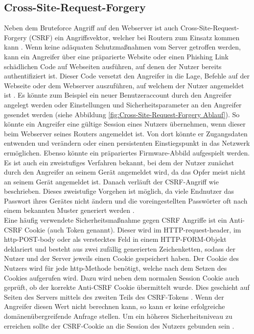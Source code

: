 \documentclass[a4paper]{book}
\begin{document}
\begin{large}
\begin{onehalfspace}
\subsection{Cross-Site-Request-Forgery}
\label{CSRF}
Neben dem Bruteforce Angriff auf den Webserver ist auch Cross-Site-Request-Forgery (CSRF) ein Angriffsvektor, welcher bei Routern zum Einsatz kommen kann \cite{Stuttard.2011}. Wenn keine adäquaten Schutzmaßnahmen vom Server getroffen werden, kann ein Angreifer über eine präparierte Website oder einen \mbox Phishing Link schädlichen Code auf Webseiten ausführen, auf denen der Nutzer bereits authentifiziert ist. Dieser Code versetzt den Angreifer in die Lage, Befehle auf der Webseite oder dem Webserver auszuführen, auf welchem der Nutzer angemeldet ist \cite{Kim.2015}. Es könnte zum Beispiel ein neuer Benutzeraccount durch den Angreifer angelegt werden oder Einstellungen und Sicherheitsparameter an den Angreifer gesendet werden (siehe Abbildung \ref{fig:Cross-Site-Request-Forgery Ablauf}). So könnte ein Angreifer eine gültige Session eines Nutzers übernehmen, wenn dieser beim Webserver seines Routers angemeldet ist. Von dort könnte er Zugangsdaten entwenden und verändern oder einen persistenten Einstiegspunkt in das Netzwerk ermöglichen. Ebenso könnte ein präpariertes Firmware-Abbild aufgespielt werden. Es ist auch ein zweistufiges Verfahren bekannt, bei dem der Nutzer zunächst durch den Angreifer an seinem Gerät angemeldet wird, da das Opfer meist nicht an seinem Gerät angemeldet ist. Danach verläuft der CSRF-Angriff wie beschrieben. Dieses zweistufige Vorgehen ist möglich, da viele Endnutzer das Passwort ihres Gerätes nicht ändern und die voreingestellten Passwörter oft nach einem bekannten Muster generiert werden \cite{Stuttard.2011}.\\
\indent Eine häufig verwendete Sicherheitsmaßnahme gegen CSRF Angriffe ist ein Anti-CSRF Cookie (auch Token genannt). Dieser wird im \glqq HTTP-request-header\grqq , im \glqq http-POST-body\grqq{} oder als verstecktes Feld in einem \glqq HTTP-FORM-Objekt\grqq{} deklariert und besteht aus zwei zufällig generierten Zeichenketten, sodass der Nutzer und der Server jeweils einen Cookie gespeichert haben. Der Cookie des Nutzers wird für jede http-Methode benötigt, welche nach dem Setzen des Cookies aufgerufen wird. Dazu wird neben dem normalen Session Cookie auch geprüft, ob der korrekte Anti-CSRF Cookie übermittelt wurde. Dies geschieht auf Seiten des Servers mittels des zweiten Teils des CSRF-Tokens \cite{Yaworski.2019}. Wenn der Angreifer diesen Wert nicht berechnen kann, so kann er keine erfolgreiche domänenübergreifende Anfrage stellen. Um ein höheres Sicherheitsniveau zu erreichen sollte der CSRF-Cookie an die Session des Nutzers gebunden sein \cite{Stuttard.2011}. \\


\end{onehalfspace}
\end{large}
\end{document}

